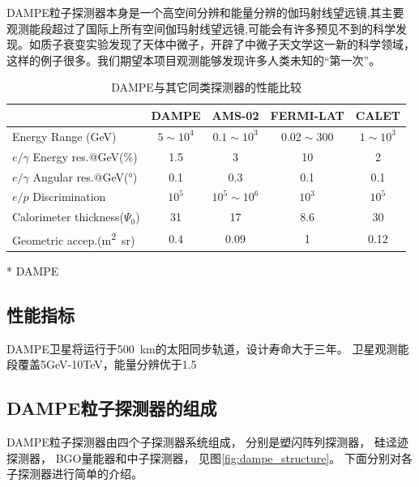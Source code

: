 DAMPE粒子探测器本身是一个高空间分辨和能量分辨的伽玛射线望远镜,其主要观测能段超过了国际上所有空间伽玛射线望远镜,可能会有许多预见不到的科学发现。如质子衰变实验发现了天体中微子，开辟了中微子天文学这一新的科学领域，这样的例子很多。我们期望本项目观测能够发现许多人类未知的“第一次”。

\begin{table}[htb]
	\centering
	\caption{DAMPE与其它同类探测器的性能比较}
	\label{tab:ch1:dampe_comparison}
	\begin{threeparttable}
	\begin{tabulary}{\linewidth}{LCCCC}
		\toprule[1.5pt]
		  & DAMPE & AMS-02 & FERMI-LAT & CALET \\ 
		\midrule[1pt]
		Energy Range (\si{GeV}) & $5\sim10^4$ & $0.1\sim10^3$ & $0.02\sim300$ & $1\sim10^3$ \\ 
		$e/\gamma$ Energy res.@\si{GeV}(\si{\percent}) & 1.5 & 3 & 10 & 2 \\ 
		$e/\gamma$ Angular res.@\si{GeV}(\si{\degree}) & 0.1 & 0.3 & 0.1 & 0.1 \\ 
		$e/p$ Discrimination& $10^5$ & $10^5\sim10^6$ & $10^3$ & $10^5$ \\ 
		Calorimeter thickness($\Psi_0$) & 31 & 17 & 8.6 & 30 \\ 
		Geometric accep.(\si{\meter\squared\steradian}) & 0.4 & 0.09 & 1 & 0.12\tnote{*} \\ 
		\bottomrule[1.5pt] 
	\end{tabulary}
	\begin{tablenotes}
		\item[*] DAMPE
	\end{tablenotes}
	\end{threeparttable}
\end{table}
    
\subsection{性能指标}
DAMPE卫星将运行于\SI{500}{\kilo\meter}的太阳同步轨道，设计寿命大于三年。
卫星观测能段覆盖5GeV-10TeV，能量分辨优于1.5%
\subsection{DAMPE粒子探测器的组成}
DAMPE粒子探测器由四个子探测器系统组成， 分别是塑闪阵列探测器， 硅迳迹探测器， BGO量能器和中子探测器， 见图\ref{fig:dampe_structure}。
下面分别对各子探测器进行简单的介绍。

